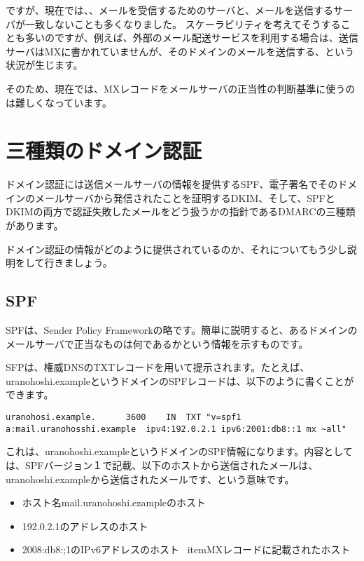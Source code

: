 ですが、現在では、、メールを受信するためのサーバと、メールを送信するサーバが一致しないことも多くなりました。 スケーラビリティを考えてそうすることも多いのですが、例えば、外部のメール配送サービスを利用する場合は、送信サーバはMXに書かれていませんが、そのドメインのメールを送信する、という状況が生じます。

そのため、現在では、MXレコードをメールサーバの正当性の判断基準に使うのは難しくなっています。

\section{三種類のドメイン認証}

ドメイン認証には送信メールサーバの情報を提供するSPF、電子署名でそのドメインのメールサーバから発信されたことを証明するDKIM、そして、SPFとDKIMの両方で認証失敗したメールをどう扱うかの指針であるDMARCの三種類があります。

ドメイン認証の情報がどのように提供されているのか、それについてもう少し説明をして行きましょう。

\subsection{SPF}

SPFは、Sender Policy Frameworkの略です。簡単に説明すると、あるドメインのメールサーバで正当なものは何であるかという情報を示すものです。

SFPは、権威DNSのTXTレコードを用いて提示されます。たとえば、uranohoshi.exampleというドメインのSPFレコードは、以下のように書くことができます。

\begin{verbatim}
uranohosi.example.		3600	IN	TXT	"v=spf1 a:mail.uranohosshi.example  ipv4:192.0.2.1 ipv6:2001:db8::1 mx ~all"
\end{verbatim}

これは、uranohoshi.exampleというドメインのSPF情報になります。内容としては、SPFバージョン１で記載、以下のホストから送信されたメールは、uranohoshi.exampleから送信されたメールです、という意味です。

\begin{itemize}
  \item ホスト名mail.uranohoshi.ezampleのホスト
  \item 192.0.2.1のアドレスのホスト
  \item 2008:db8:;1のIPv6アドレスのホスト
  \ itemMXレコードに記載されたホスト
\end{itemize}

